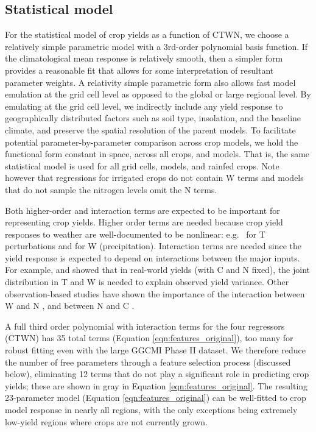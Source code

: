 \documentclass[gmd, manuscript]{copernicus} %
\begin{document}
\subsection{Statistical model}
For the statistical model of crop yields as a function of CTWN, we choose a relatively simple parametric model with a 3rd-order polynomial basis function. 
If the climatological mean response is relatively smooth, then a simpler form provides a reasonable fit that allows for some interpretation of resultant parameter weights. 
A relativity simple parametric form also allows fast model emulation at the grid cell level as opposed to the global or large regional level. 
By emulating at the grid cell level, we indirectly include any yield response to geographically distributed factors such as soil type, insolation, and the baseline climate, and preserve the spatial resolution of the parent models.
To facilitate potential parameter-by-parameter comparison across crop models, we hold the functional form constant in space, across all crops, and models. 
That is, the same statistical model is used for all grid cells, models, and rainfed crops. 
Note however that regressions for irrigated crops do not contain W terms and models that do not sample the nitrogen levels omit the N terms.

Both higher-order and interaction terms are expected to be important for representing crop yields. Higher order terms are needed because crop yield responses to weather are well-documented to be nonlinear: e.g.\ \citet{Schlenker2009} for T perturbations and \citet{He2016} for W (precipitation). 
Interaction terms are needed since the yield response is expected to depend on interactions between the major inputs. 
For example, \citet{Lobell2007} and \citet{Tebaldi2008} showed that in real-world yields (with C and N fixed), the joint distribution in T and W is needed to explain observed yield variance.  
Other observation-based studies have shown the importance of the interaction between W and N \citep[e.g.][]{AULAKH2005}, and between N and C \citep{Mitsuru92, Nakamura97}. 

A full third order polynomial with interaction terms for the four regressors (CTWN) has 35 total terms (Equation \ref{eqn:features_original}), too many for robust fitting even with the large GGCMI Phase II dataset. 
We therefore reduce the number of free parameters through a feature selection process (discussed below), eliminating 12 terms that do not play a significant role in predicting crop yields; these are shown in {\color{dark-gray}gray} in Equation \ref{eqn:features_original}. 
The resulting 23-parameter model (Equation \ref{eqn:features_original}) can be well-fitted to crop model response in nearly all regions, with the only exceptions being extremely low-yield regions where crops are not currently grown.
\end{document}
